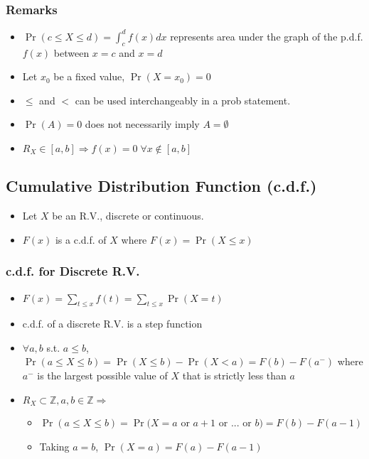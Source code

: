 \documentclass[10pt]{article}
\begin{document}
\subsubsection*{Remarks}
\begin{itemize}
    \item $\Pr(c\leq X \leq d) = \int_{c}^{d}f(x)dx$ represents area under the graph of the p.d.f. $f(x)$ between $x=c$ and $x=d$
    \item Let $x_0$ be a fixed value, $\Pr(X=x_0) = 0$
    \item $\leq$ and $<$ can be used interchangeably in a prob statement.
    \item $\Pr(A) = 0$ does not necessarily imply $A = \emptyset$
    \item $R_X \in [a, b] \Rightarrow f(x) = 0 \;\forall x \notin [a, b]$
\end{itemize}
\subsection*{Cumulative Distribution Function (c.d.f.)}
\begin{itemize}
    \item Let $X$ be an R.V., discrete or continuous.
    \item $F(x)$ is a c.d.f. of $X$ where $F(x) = \Pr(X\leq x)$
\end{itemize}
\subsubsection*{c.d.f. for Discrete R.V.}
\begin{itemize}
    \item $F(x) = \sum_{t\leq x}^{}f(t) = \sum_{t\leq x}^{} \Pr(X=t)$
    \item c.d.f. of a discrete R.V. is a step function
    \item $\forall a, b$ s.t. $a\leq b$, $\Pr(a\leq X \leq b) = \Pr(X \leq b) - \Pr(X < a) = F(b) - F(a^-)$ where $a^-$ is the largest possible value of $X$ that is strictly less than $a$
    \item $R_X \subset \mathbb{Z}, a, b \in \mathbb{Z} \Rightarrow$
          \begin{itemize}
              \item $\Pr(a \leq X \leq b) = \Pr(X = a$ or $a+1$ or $...$ or $b) = F(b) - F(a - 1)$
              \item Taking $a = b$, $\Pr(X=a) = F(a) - F(a - 1)$
          \end{itemize}
\end{itemize}
\end{document}
